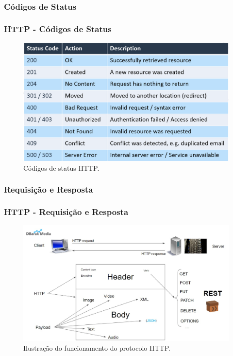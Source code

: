 \documentclass[
	10pt, %
	t, %
]{beamer}
\begin{document}
\subsubsection{Códigos de Status}

\begin{frame}
	\frametitle{HTTP - Códigos de Status}

	\begin{figure}
		\centering
		\includegraphics[width=0.9\linewidth]{status_code.png}
		\caption{Códigos de status HTTP.}
		\label{fig:status}
	\end{figure}

\end{frame}

\subsubsection{Requisição e Resposta}

\begin{frame}
	\frametitle{HTTP - Requisição e Resposta}

	\begin{figure}
		\centering
		\includegraphics[width=0.9\linewidth]{http_explained.jpg}
		\caption{Ilustração do funcionamento do protocolo HTTP.}
		\label{fig:http}
	\end{figure}

\end{frame}
\end{document}
